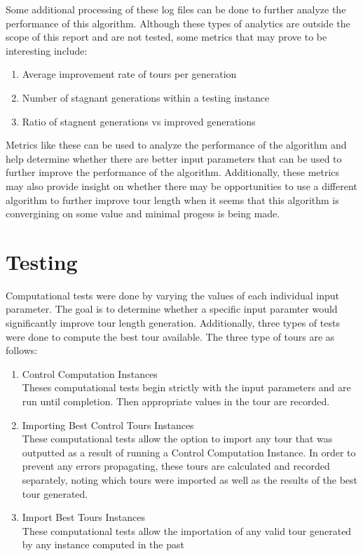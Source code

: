 \documentclass[12pt]{article}
\begin{document}
Some additional processing of these log files can be done to further analyze the performance of this algorithm. Although these types of analytics are outside the scope of this report and are not tested, some metrics that may prove to be interesting include:
\begin{enumerate}
  \item Average improvement rate of tours per generation
  \item Number of stagnant generations within a testing instance
  \item Ratio of stagnent generations vs improved generations
\end{enumerate}

Metrics like these can be used to analyze the performance of the algorithm and help determine whether there are better input parameters that can be used to further improve the performance of the algorithm. Additionally, these metrics may also provide insight on whether there may be opportunities to use a different algorithm to further improve tour length when it seems that this algorithm is convergining on some value and minimal progess is being made.\\

\section{Testing}

Computational tests were done by varying the values of each individual input parameter. The goal is to determine whether a specific input paramter would significantly improve tour length generation. Additionally, three types of tests were done to compute the best tour available. The three type of tours are as follows:
\begin{enumerate}
  \item Control Computation Instances\\

  Theses computational tests begin strictly with the input parameters and are run until completion. Then appropriate values in the tour are recorded.

  \item Importing Best Control Tours Instances\\

  These computational tests allow the option to import any tour that was outputted as a result of running a Control Computation Instance. In order to prevent any errors propagating, these tours are calculated and recorded separately, noting which tours were imported as well as the results of the best tour generated.

  \item Import Best Tours Instances\\

  These computational tests allow the importation of any valid tour generated by any instance computed in the past
\end{enumerate}
\end{document}

